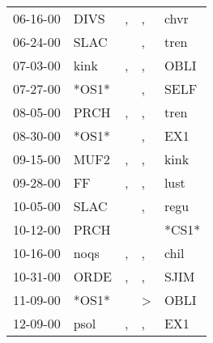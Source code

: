 \begin{supertabular}{p{0.07\textwidth}p{0.06\textwidth}p{0.02\textwidth}p{0.02\textwidth}p{0.06\textwidth}}
          06-16-00\textsuperscript{} &           DIVS\textsuperscript{} &                , &                , &           chvr\textsuperscript{} \\
          06-24-00\textsuperscript{} &           SLAC\textsuperscript{} &                  &                , &           tren\textsuperscript{} \\
          07-03-00\textsuperscript{} &           kink\textsuperscript{} &                , &                , &           OBLI\textsuperscript{} \\
          07-27-00\textsuperscript{} &                            *OS1* &                  &                , &           SELF\textsuperscript{} \\
          08-05-00\textsuperscript{} &           PRCH\textsuperscript{} &                , &                , &           tren\textsuperscript{} \\
          08-30-00\textsuperscript{} &                            *OS1* &                  &                , &            EX1\textsuperscript{} \\
          09-15-00\textsuperscript{} &           MUF2\textsuperscript{} &                , &                , &           kink\textsuperscript{} \\
          09-28-00\textsuperscript{} &             FF\textsuperscript{} &                , &                , &           lust\textsuperscript{} \\
          10-05-00\textsuperscript{} &           SLAC\textsuperscript{} &                  &                , &           regu\textsuperscript{} \\
          10-12-00\textsuperscript{} &           PRCH\textsuperscript{} &                  &                  &                            *CS1* \\
          10-16-00\textsuperscript{} &           noqs\textsuperscript{} &                , &                , &           chil\textsuperscript{} \\
          10-31-00\textsuperscript{} &           ORDE\textsuperscript{} &                , &                , &           SJIM\textsuperscript{} \\
          11-09-00\textsuperscript{} &                            *OS1* &                  &     \textgreater &           OBLI\textsuperscript{} \\
          12-09-00\textsuperscript{} &           psol\textsuperscript{} &                , &                , &            EX1\textsuperscript{} \\

\end{supertabular}
